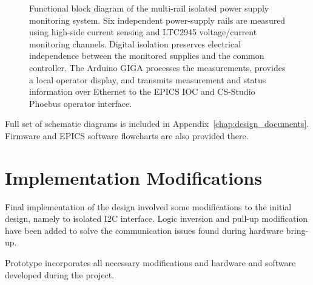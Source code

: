\begin{figure}[H]
{{\begin{minipage}{0.9\textheight}
{%
                }

                \vspace{0.25cm}

                \caption{
                    Functional block diagram of the multi-rail isolated
                    power supply monitoring system. Six independent power-supply rails
                    are measured using high-side current sensing and LTC2945 voltage/current
                    monitoring channels. Digital isolation preserves electrical independence
                    between the monitored supplies and the common controller. The Arduino
                    GIGA processes the measurements, provides a local operator display, and
                    transmits measurement and status information over Ethernet to the EPICS
                    IOC and CS-Studio Phoebus operator interface.
                }
                \label{fig:functional-block-diagram}

            \end{minipage}%
        }%
    }

\end{figure}

Full set of schematic diagrams is included in
Appendix~\ref{chap:design_documents}. Firmware and EPICS
software flowcharts are also provided there.

\section{Implementation Modifications}

Final implementation of the design involved some modifications
to the initial design, namely to isolated I2C interface.
Logic inversion and pull-up modification have been added to
solve the communication issues found during hardware bring-up.

Prototype incorporates all necessary modifications and
hardware and software developed during the project.